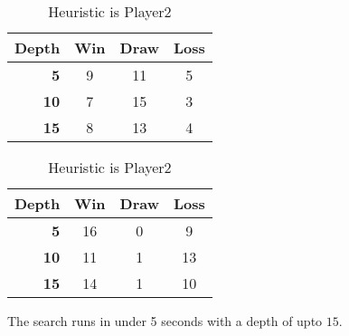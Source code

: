 \documentclass[a4paper]{article}
\begin{document}
\begin{table}[h]
	\centering
	\caption{Heuristic is Player1}
	\begin{tabular}{|r|c|c|c|}
		\hline
		\textbf{Depth} & \multicolumn{1}{l|}{\textbf{Win}} & \multicolumn{1}{l|}{\textbf{Draw}} & \multicolumn{1}{l|}{\textbf{Loss}} \\ \hline
		\textbf{5}     & 9                                 & 11                                 & 5                                  \\ \hline
		\textbf{10}    & 7                                 & 15                                 & 3                                  \\ \hline
		\textbf{15}    & 8                                 & 13                                 & 4                                  \\ \hline
	\end{tabular}
	\caption{Heuristic is Player2}
	\begin{tabular}{|r|c|c|c|}
		\hline
		\textbf{Depth} & \multicolumn{1}{l|}{\textbf{Win}} & \multicolumn{1}{l|}{\textbf{Draw}} & \multicolumn{1}{l|}{\textbf{Loss}} \\ \hline
		\textbf{5}     & 16                                & 0                                  & 9                                  \\ \hline
		\textbf{10}    & 11                                & 1                                  & 13                                 \\ \hline
		\textbf{15}    & 14                                & 1                                  & 10                                 \\ \hline
	\end{tabular}
\end{table}
The search runs in under 5 seconds with a depth of upto $15$.
\end{document}

